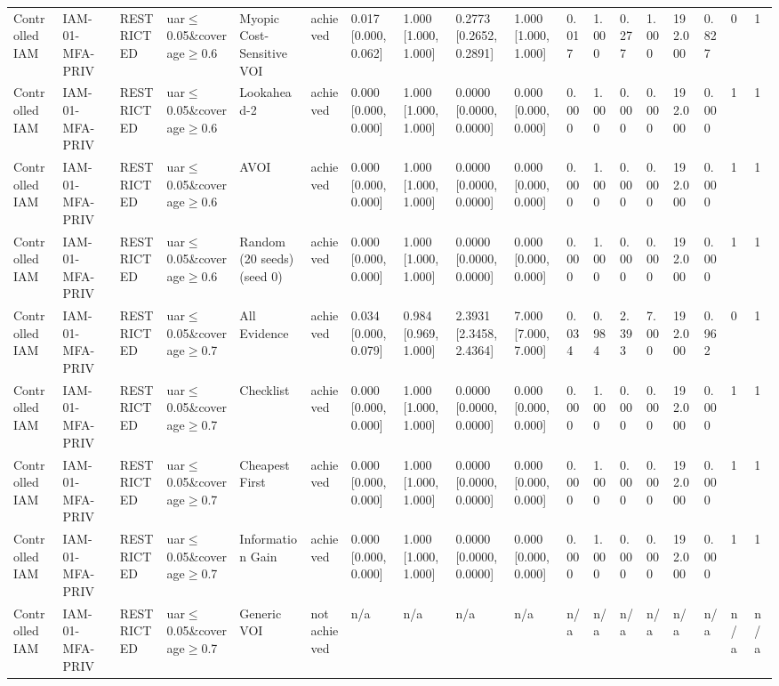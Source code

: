 \begin{table}[!ht]
{\begin{tabular}{llllllllllllllllll}
Controlled IAM & IAM-01-MFA-PRIV & RESTRICTED & uar$\le$0.05\&coverage$\ge$0.6 & Myopic Cost-Sensitive VOI & achieved & 0.017 [0.000, 0.062] & 1.000 [1.000, 1.000] & 0.2773 [0.2652, 0.2891] & 1.000 [1.000, 1.000] & 0.017 & 1.000 & 0.277 & 1.000 & 192.000 & 0.827 & 0 & 1 \\
Controlled IAM & IAM-01-MFA-PRIV & RESTRICTED & uar$\le$0.05\&coverage$\ge$0.6 & Lookahead-2 & achieved & 0.000 [0.000, 0.000] & 1.000 [1.000, 1.000] & 0.0000 [0.0000, 0.0000] & 0.000 [0.000, 0.000] & 0.000 & 1.000 & 0.000 & 0.000 & 192.000 & 0.000 & 1 & 1 \\
Controlled IAM & IAM-01-MFA-PRIV & RESTRICTED & uar$\le$0.05\&coverage$\ge$0.6 & AVOI & achieved & 0.000 [0.000, 0.000] & 1.000 [1.000, 1.000] & 0.0000 [0.0000, 0.0000] & 0.000 [0.000, 0.000] & 0.000 & 1.000 & 0.000 & 0.000 & 192.000 & 0.000 & 1 & 1 \\
Controlled IAM & IAM-01-MFA-PRIV & RESTRICTED & uar$\le$0.05\&coverage$\ge$0.6 & Random (20 seeds) (seed 0) & achieved & 0.000 [0.000, 0.000] & 1.000 [1.000, 1.000] & 0.0000 [0.0000, 0.0000] & 0.000 [0.000, 0.000] & 0.000 & 1.000 & 0.000 & 0.000 & 192.000 & 0.000 & 1 & 1 \\
Controlled IAM & IAM-01-MFA-PRIV & RESTRICTED & uar$\le$0.05\&coverage$\ge$0.7 & All Evidence & achieved & 0.034 [0.000, 0.079] & 0.984 [0.969, 1.000] & 2.3931 [2.3458, 2.4364] & 7.000 [7.000, 7.000] & 0.034 & 0.984 & 2.393 & 7.000 & 192.000 & 0.962 & 0 & 1 \\
Controlled IAM & IAM-01-MFA-PRIV & RESTRICTED & uar$\le$0.05\&coverage$\ge$0.7 & Checklist & achieved & 0.000 [0.000, 0.000] & 1.000 [1.000, 1.000] & 0.0000 [0.0000, 0.0000] & 0.000 [0.000, 0.000] & 0.000 & 1.000 & 0.000 & 0.000 & 192.000 & 0.000 & 1 & 1 \\
Controlled IAM & IAM-01-MFA-PRIV & RESTRICTED & uar$\le$0.05\&coverage$\ge$0.7 & Cheapest First & achieved & 0.000 [0.000, 0.000] & 1.000 [1.000, 1.000] & 0.0000 [0.0000, 0.0000] & 0.000 [0.000, 0.000] & 0.000 & 1.000 & 0.000 & 0.000 & 192.000 & 0.000 & 1 & 1 \\
Controlled IAM & IAM-01-MFA-PRIV & RESTRICTED & uar$\le$0.05\&coverage$\ge$0.7 & Information Gain & achieved & 0.000 [0.000, 0.000] & 1.000 [1.000, 1.000] & 0.0000 [0.0000, 0.0000] & 0.000 [0.000, 0.000] & 0.000 & 1.000 & 0.000 & 0.000 & 192.000 & 0.000 & 1 & 1 \\
Controlled IAM & IAM-01-MFA-PRIV & RESTRICTED & uar$\le$0.05\&coverage$\ge$0.7 & Generic VOI & not achieved & n/a & n/a & n/a & n/a & n/a & n/a & n/a & n/a & n/a & n/a & n/a & n/a \\

\end{tabular}}
\end{table}
